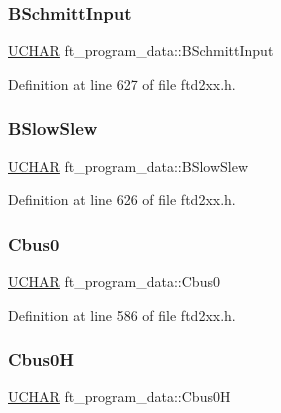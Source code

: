 \subsubsection{\texorpdfstring{B\+Schmitt\+Input}{BSchmittInput}}
{\footnotesize\ttfamily \hyperlink{CatCaloProto40MHz_2inc_2WinTypes_8h_a4f4bb67531a9bf6f0b9c6ad76aeba587}{U\+C\+H\+AR} ft\+\_\+program\+\_\+data\+::\+B\+Schmitt\+Input}



Definition at line 627 of file ftd2xx.\+h.

\mbox{\label{structft__program__data_aed9e9f03c08c0ed471cd8387f4c64769}} 
\subsubsection{\texorpdfstring{B\+Slow\+Slew}{BSlowSlew}}
{\footnotesize\ttfamily \hyperlink{CatCaloProto40MHz_2inc_2WinTypes_8h_a4f4bb67531a9bf6f0b9c6ad76aeba587}{U\+C\+H\+AR} ft\+\_\+program\+\_\+data\+::\+B\+Slow\+Slew}



Definition at line 626 of file ftd2xx.\+h.

\mbox{\label{structft__program__data_a02d61a180eb84a3d1d2689f282edd71b}} 
\subsubsection{\texorpdfstring{Cbus0}{Cbus0}}
{\footnotesize\ttfamily \hyperlink{CatCaloProto40MHz_2inc_2WinTypes_8h_a4f4bb67531a9bf6f0b9c6ad76aeba587}{U\+C\+H\+AR} ft\+\_\+program\+\_\+data\+::\+Cbus0}



Definition at line 586 of file ftd2xx.\+h.

\mbox{\label{structft__program__data_a8169983d1360fc06058745cb9cc7277e}} 
\subsubsection{\texorpdfstring{Cbus0H}{Cbus0H}}
{\footnotesize\ttfamily \hyperlink{CatCaloProto40MHz_2inc_2WinTypes_8h_a4f4bb67531a9bf6f0b9c6ad76aeba587}{U\+C\+H\+AR} ft\+\_\+program\+\_\+data\+::\+Cbus0H}




